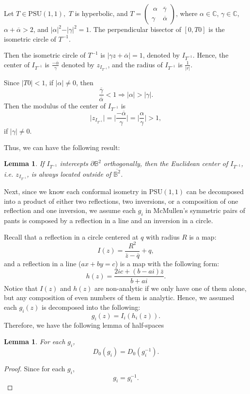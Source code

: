 \documentclass[12pt,oneside]{sfsuthesis}
\theoremstyle{plain} %
\newtheorem{lemma}[theorem]{Lemma}
\theoremstyle{definition}  %
\theoremstyle{remark}  %
\theoremstyle{plain}
\begin{document}
{Let $T\in \text{PSU}(1,1),$ $T$ is hyperbolic, and $T=\begin{pmatrix}\
\alpha &  \overline{\gamma}\\
\gamma &  \overline{\alpha}
\end{pmatrix}$, where $\alpha\in\mathbb{C}$, $\gamma\in\mathbb{C}$, $\alpha+\overline{\alpha}>2$, and $\vert \alpha\vert^2- \vert \gamma\vert^2=1$. The perpendicular bisector of $[0,T0]$ is the isometric circle of $T^{-1}$. 

Then the isometric circle of $T^{-1}$ is $\vert \gamma z + \overline{\alpha}\vert=1$, denoted by $I_{T^{-1}}$. Hence, the center of $I_{T^{-1}}$ is $\frac{-\overline{\alpha}}{\gamma}$ denoted by $z_{I_{T^{-1}}}$, and the radius of $I_{T^{-1}}$ is $\frac{1}{\vert r\vert}$.

Since $\vert T0\vert<1$, if $\vert \alpha \vert\neq 0$, then  
$$
\frac{\overline{\gamma}}{\overline{\alpha}}<1 \Rightarrow \vert \alpha \vert>\vert \gamma\vert.
$$
Then the modulus of the center of $I_{T^{-1}}$ is 
$$
\vert z_{I_{T^{-1}}}\vert = \bigg| \frac{-\overline{\alpha}}{\gamma} \bigg| =\bigg| \frac{\alpha}{\gamma} \bigg| >1,
$$
if $\vert \gamma \vert \neq 0$.

Thus, we can have the following result:
\begin{lemma}
If $I_{T^{-1}}$ intercepts $\partial\mathbb{B}^2$ orthogonally, then the Euclidean center of $I_{T^{-1}}$, i.e. $z_{I_{T^{-1}}}$, is always located outside of $\overline{\mathbb{B}^2}$.
\end{lemma}

Next, since we know each conformal isometry in $\text{PSU}(1,1)$ can be decomposed into a product of either two reflections, two inversions, or a composition of one reflection and one inversion, we assume each $g_i$ in McMullen's symmetric pairs of pants is composed by a reflection in a line and an inversion in a circle. 

Recall that a reflection in a circle centered at $q$ with radius $R$ is a map:
$$
I(z)=\frac{R^2}{\overline{z}-\overline{q}}+q,
$$
and a reflection in a line ($ax+by=c$) is a map with the following form:
$$
h(z)=\frac{2 i c+(b-ai)\overline{z}}{b+ai}.
$$
Notice that $I(z)$ and $h(z)$ are non-analytic if we only have one of them alone, but any composition of even numbers of them is analytic. Hence, we assumed each $g_i(z)$ is decomposed into the following:
$$
g_i(z)=I_i(h_i(z)).
$$
Therefore, we have the following lemma of half-spaces
\begin{lemma}
For each $g_i$,
$$
D_0(g_i)= D_0(g_i^{-1}).
$$
\end{lemma}
\begin{proof}
Since for each $g_i$, 
$$
g_i=g_i^{-1}.
$$
\end{proof}

}
\end{document}
